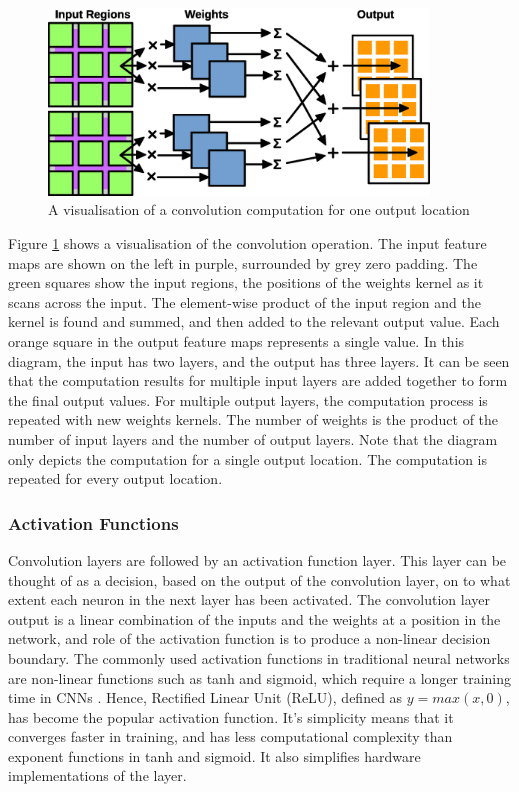 \documentclass[12pt]{article}
\begin{document}
\begin{figure} [H]
\centering
\includegraphics[width=0.9\textwidth]{figures/conv.eps}
\caption{A visualisation of a convolution computation for one output location}
\label{fig:conv}
\end{figure}

Figure \ref{fig:conv} shows a visualisation of the convolution operation. The input feature maps are shown on the left in purple, surrounded by grey zero padding. The green squares show the input regions, the positions of the weights kernel as it scans across the input. The element-wise product of the input region and the kernel is found and summed, and then added to the relevant output value. Each orange square in the output feature maps represents a single value. In this diagram, the input has two layers, and the output has three layers. It can be seen that the computation results for multiple input layers are added together to form the final output values. For multiple output layers, the computation process is repeated with new weights kernels. The number of weights is the product of the number of input layers and the number of output layers. Note that the diagram only depicts the computation for a single output location. The computation is repeated for every output location. 


\subsubsection{Activation Functions}
\label{sec:Background-CNN-Activation}

Convolution layers are followed by an activation function layer. This layer can be thought of as a decision, based on the output of the convolution layer, on to what extent each neuron in the next layer has been activated. The convolution layer output is a linear combination of the inputs and the weights at a position in the network, and role of the activation function is to produce a non-linear decision boundary. The commonly used activation functions in traditional neural networks are non-linear functions such as tanh and sigmoid, which require a longer training time in CNNs \cite{AlexNet}. Hence, Rectified Linear Unit (ReLU), defined as $y = max(x,0)$, has become the popular activation function. It's simplicity means that it converges faster in training, and has less computational complexity than exponent functions in tanh and sigmoid. It also simplifies hardware implementations of the layer.
\end{document}
